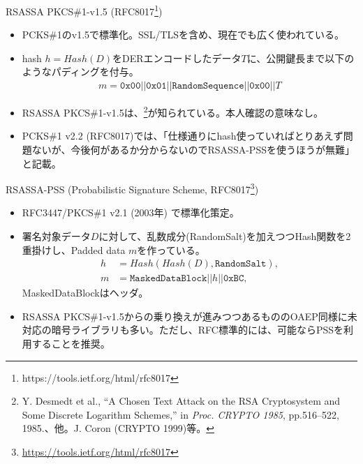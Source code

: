 \documentclass[12pt,dvipdfmx]{beamer}
\begin{document}
\begin{frame}
 \begin{block}{\small RSASSA PKCS\#1-v1.5 (RFC8017\footnote[frame]{\scriptsize https://tools.ietf.org/html/rfc8017})}
\begin{itemize}
 \item {} PCKS\#1のv1.5で標準化。SSL/TLSを含め、現在でも広く使われている。
 \item hash $h = \mathit{Hash}(D)$をDERエンコードしたデータ$T$に、公開鍵長まで以下のようなパディングを付与。
\begin{align*}
m = \mathtt{0x00 || 0x01 || RandomSequence || 0x00 ||} T
\end{align*}
 \item RSASSA PKCS\#1-v1.5は、\footnote[frame]{\scriptsize Y. Desmedt et al., ``A Chosen Text Attack on the  RSA Cryptosystem and Some Discrete Logarithm Schemes,'' in \textit{Proc. CRYPTO 1985}, pp.516--522, 1985.、他。J. Coron (CRYPTO 1999)等。}が知られている。本人確認の意味なし。
 \item PCKS\#1 v2.2 (RFC8017)では、「仕様通りにhash使っていればとりあえず問題ないが、今後何があるか分からないので\alert{RSASSA-PSSを使うほうが無難}」と記載。
\end{itemize}
\end{block}
\end{frame}

\begin{frame}
\begin{block}{\small RSASSA-PSS (Probabilistic Signature Scheme, RFC8017\footnote[frame]{\scriptsize \url{https://tools.ietf.org/html/rfc8017}})}
\begin{itemize}
 \item {} RFC3447/PKCS\#1 v2.1 (2003年) で標準化策定。
 \item 署名対象データ$D$に対して、乱数成分(RandomSalt)を加えつつHash関数を2重掛けし、Padded data $m$を作っている。
\begin{align*}
h &= Hash(Hash(D), \texttt{RandomSalt}),\\
m &= \texttt{MaskedDataBlock} || h || \texttt{0xBC},
\end{align*}
MaskedDataBlockはヘッダ。
 \item RSASSA PKCS\#1-v1.5からの乗り換えが進みつつあるものの\alert{OAEP同様に未対応の暗号ライブラリも多い}。ただし、RFC標準的には、可能ならPSSを利用することを推奨。
\end{itemize}
\end{block}

\end{frame}
\end{document}
